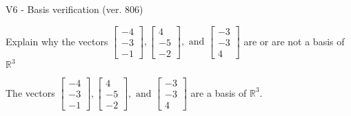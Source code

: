 \begin{exercise}
  \begin{exerciseTitle}V6 - Basis verification (ver. 806)\end{exerciseTitle}
  \begin{exerciseStatement}
    Explain why the vectors \(\left[\begin{array}{r}
-4 \\
-3 \\
-1
\end{array}\right] , \left[\begin{array}{r}
4 \\
-5 \\
-2
\end{array}\right] , \text{ and } \left[\begin{array}{r}
-3 \\
-3 \\
4
\end{array}\right]\) are or are not a basis of \(\mathbb{R}^3\)	


  \end{exerciseStatement}
  \begin{exerciseAnswer}
   The vectors \(\left[\begin{array}{r}
-4 \\
-3 \\
-1
\end{array}\right] , \left[\begin{array}{r}
4 \\
-5 \\
-2
\end{array}\right] , \text{ and } \left[\begin{array}{r}
-3 \\
-3 \\
4
\end{array}\right]\) 
  	 are  a basis of \(\mathbb{R}^3\).
  


  \end{exerciseAnswer}
\end{exercise}
